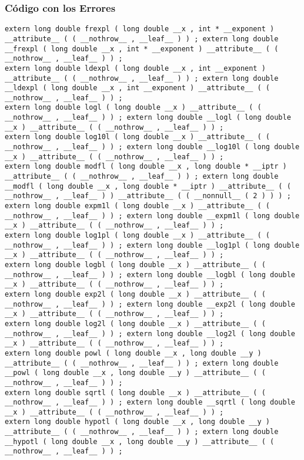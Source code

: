 \documentclass{beamer}
\begin{document}
\begin{frame}[fragile]
\frametitle{C\'odigo con los Errores}
\begin{verbatim}
extern long double frexpl ( long double __x , int * __exponent ) __attribute__ ( ( __nothrow__ , __leaf__ ) ) ; extern long double __frexpl ( long double __x , int * __exponent ) __attribute__ ( ( __nothrow__ , __leaf__ ) ) ; 
extern long double ldexpl ( long double __x , int __exponent ) __attribute__ ( ( __nothrow__ , __leaf__ ) ) ; extern long double __ldexpl ( long double __x , int __exponent ) __attribute__ ( ( __nothrow__ , __leaf__ ) ) ; 
extern long double logl ( long double __x ) __attribute__ ( ( __nothrow__ , __leaf__ ) ) ; extern long double __logl ( long double __x ) __attribute__ ( ( __nothrow__ , __leaf__ ) ) ; 
extern long double log10l ( long double __x ) __attribute__ ( ( __nothrow__ , __leaf__ ) ) ; extern long double __log10l ( long double __x ) __attribute__ ( ( __nothrow__ , __leaf__ ) ) ; 
extern long double modfl ( long double __x , long double * __iptr ) __attribute__ ( ( __nothrow__ , __leaf__ ) ) ; extern long double __modfl ( long double __x , long double * __iptr ) __attribute__ ( ( __nothrow__ , __leaf__ ) ) __attribute__ ( ( __nonnull__ ( 2 ) ) ) ; 
extern long double expm1l ( long double __x ) __attribute__ ( ( __nothrow__ , __leaf__ ) ) ; extern long double __expm1l ( long double __x ) __attribute__ ( ( __nothrow__ , __leaf__ ) ) ; 
extern long double log1pl ( long double __x ) __attribute__ ( ( __nothrow__ , __leaf__ ) ) ; extern long double __log1pl ( long double __x ) __attribute__ ( ( __nothrow__ , __leaf__ ) ) ; 
extern long double logbl ( long double __x ) __attribute__ ( ( __nothrow__ , __leaf__ ) ) ; extern long double __logbl ( long double __x ) __attribute__ ( ( __nothrow__ , __leaf__ ) ) ; 
extern long double exp2l ( long double __x ) __attribute__ ( ( __nothrow__ , __leaf__ ) ) ; extern long double __exp2l ( long double __x ) __attribute__ ( ( __nothrow__ , __leaf__ ) ) ; 
extern long double log2l ( long double __x ) __attribute__ ( ( __nothrow__ , __leaf__ ) ) ; extern long double __log2l ( long double __x ) __attribute__ ( ( __nothrow__ , __leaf__ ) ) ; 
extern long double powl ( long double __x , long double __y ) __attribute__ ( ( __nothrow__ , __leaf__ ) ) ; extern long double __powl ( long double __x , long double __y ) __attribute__ ( ( __nothrow__ , __leaf__ ) ) ; 
extern long double sqrtl ( long double __x ) __attribute__ ( ( __nothrow__ , __leaf__ ) ) ; extern long double __sqrtl ( long double __x ) __attribute__ ( ( __nothrow__ , __leaf__ ) ) ; 
extern long double hypotl ( long double __x , long double __y ) __attribute__ ( ( __nothrow__ , __leaf__ ) ) ; extern long double __hypotl ( long double __x , long double __y ) __attribute__ ( ( __nothrow__ , __leaf__ ) ) ; 
\end{verbatim}
\end{frame}
\end{document}
